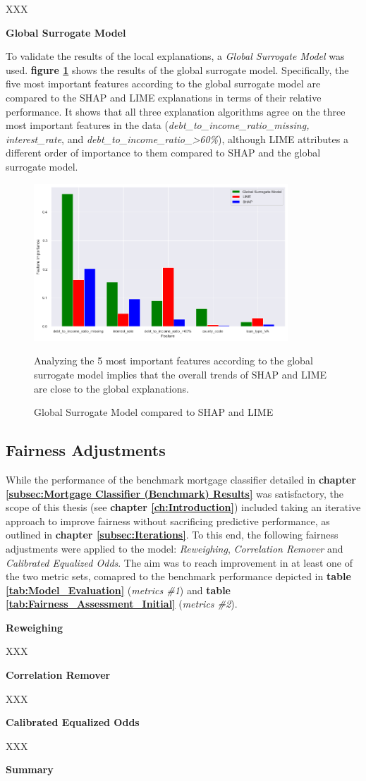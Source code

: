 XXX

\textbf{Global Surrogate Model}

To validate the results of the local explanations, a \textit{Global Surrogate Model} was used. \textbf{figure \ref{fig:Global_Surrogate}} shows the results of the global surrogate model. Specifically, the five most important features according to the global surrogate model are compared to the SHAP and LIME explanations in terms of their relative performance.
It shows that all three explanation algorithms agree on the three most important features in the data (\textit{debt\_to\_income\_ratio\_missing, interest\_rate}, and \textit{debt\_to\_income\_ratio\_>60\%}), although LIME attributes a different order of importance to them compared to SHAP and the global surrogate model.

\begin{figure}[h]
    \centering
    \includegraphics[width=0.85\textwidth]{images/CHXX_UPDATE_Surrogate_SHAP_LIME_combined.png}
    \caption{Global Surrogate Model compared to SHAP and LIME}
    \medskip
    \small
    Analyzing the 5 most important features according to the global surrogate model implies that the overall trends of SHAP and LIME are close to the global explanations.
    \label{fig:Global_Surrogate}
\end{figure}

\subsection{Fairness Adjustments}\label{Fairness Adjustments Results}

While the performance of the benchmark mortgage classifier detailed in \textbf{chapter \ref{subsec:Mortgage Classifier (Benchmark) Results}} was satisfactory, the scope of this thesis (see \textbf{chapter \ref{ch:Introduction}}) included taking an iterative approach to improve fairness without sacrificing predictive performance, as outlined in \textbf{chapter \ref{subsec:Iterations}}.
To this end, the following fairness adjustments were applied to the model: \textit{Reweighing}, \textit{Correlation Remover} and \textit{Calibrated Equalized Odds}. The aim was to reach improvement in at least one of the two metric sets, comapred to the benchmark performance depicted in \textbf{table \ref{tab:Model_Evaluation}} (\textit{metrics \#1}) and \textbf{table \ref{tab:Fairness_Assessment_Initial}} (\textit{metrics \#2}).

\textbf{Reweighing}

XXX

\textbf{Correlation Remover}

XXX

\textbf{Calibrated Equalized Odds}

XXX

\textbf{Summary}

